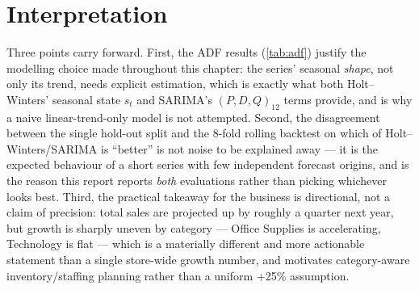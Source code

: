 \section{Interpretation}
Three points carry forward. First, the ADF results
(\cref{tab:adf}) justify the modelling choice made throughout this
chapter: the series' seasonal \emph{shape}, not only its trend, needs
explicit estimation, which is exactly what both Holt--Winters'
seasonal state $s_t$ and SARIMA's $(P,D,Q)_{12}$ terms provide, and is
why a naive linear-trend-only model is not attempted. Second, the
disagreement between the single hold-out split and the 8-fold rolling
backtest on which of Holt--Winters/SARIMA is ``better'' is not noise to be
explained away — it is the expected behaviour of a short series with
few independent forecast origins, and is the reason this report reports
\emph{both} evaluations rather than picking whichever looks best. Third,
the practical takeaway for the business is directional, not a claim of
precision: total sales are projected up by roughly a quarter next year,
but growth is sharply uneven by category — Office Supplies is
accelerating, Technology is flat — which is a materially different and
more actionable statement than a single store-wide growth number, and
motivates category-aware inventory/staffing planning rather than a
uniform +25\% assumption.
